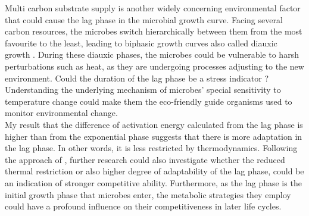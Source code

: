 \documentclass[a4paper]{article}
\begin{document}
Multi carbon substrate supply is another widely concerning environmental factor that could cause the lag phase in the microbial growth curve. Facing several carbon resources, the microbes switch hierarchically between them from the most favourite to the least, leading to biphasic growth curves also called diauxic growth \citep{monod1949growth}. During these diauxic phases, the microbes could be vulnerable to harsh perturbations such as heat, as they are undergoing processes adjusting to the new environment. Could the duration of the lag phase be a stress indicator \citep{hamill2020microbial}? Understanding the underlying mechanism of microbes' special sensitivity to temperature change could make them the eco-friendly guide organisms used to monitor environmental change. \\

My result that the difference of activation energy calculated from the lag phase is higher than from the exponential phase suggests that there is more adaptation in the lag phase. In other words, it is less restricted by thermodynamics. Following the approach of \citealt{hamill2020microbial}, further research could also investigate whether the reduced thermal restriction or also higher degree of adaptability of the lag phase, could be an indication of stronger competitive ability. Furthermore, as the lag phase is the initial growth phase that microbes enter, the metabolic strategies they employ could have a profound influence on their competitiveness in later life cycles. \\
\end{document}
